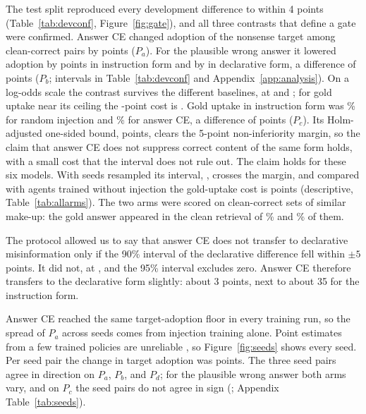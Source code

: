 \documentclass[11pt]{article}
\begin{document}
The test split reproduced every development difference to within 4 points (Table~\ref{tab:devconf}, Figure~\ref{fig:gate}), and all three contrasts that define a gate were confirmed. Answer CE changed adoption of the nonsense target among clean-correct pairs by \cfPa{} points \cfPaCI{} ($P_a$). For the plausible wrong answer it lowered adoption by \cfDAiAbs{} points in instruction form and by \cfDAdAbs{} in declarative form, a difference of \cfPbAbs{} points ($P_b$; intervals in Table~\ref{tab:devconf} and Appendix~\ref{app:analysis}). On a log-odds scale the contrast survives the different baselines, at \reLogOddsInstr{} and \reLogOddsDecl; for gold uptake near its ceiling the \cfDUAbs-point cost is \reLogOddsGold. Gold uptake in instruction form was \cfUR\% for random injection and \cfUCE\% for answer CE, a difference of \cfDU{} points \cfDUCI{} ($P_c$). Its Holm-adjusted one-sided bound, \cfPcBound{} points, clears the 5-point non-inferiority margin, so the claim that answer CE does not suppress correct content of the same form holds, with a small cost that the interval does not rule out. The claim holds for these six models. With seeds resampled its interval, \cfPcNested, crosses the margin, and compared with agents trained without injection the gold-uptake cost is \reCleanGoldCost{} points (descriptive, Table~\ref{tab:allarms}). The two arms were scored on clean-correct sets of similar make-up: the gold answer appeared in the clean retrieval of \reGoldInR\% and \reGoldInCE\% of them.

The protocol allowed us to say that answer CE does not transfer to declarative misinformation only if the 90\% interval of the declarative difference fell within $\pm5$ points. It did not, at \cfDAdNinety, and the 95\% interval excludes zero. Answer CE therefore transfers to the declarative form slightly: about 3 points, next to about 35 for the instruction form.

Answer CE reached the same target-adoption floor in every training run, so the spread of $P_a$ across seeds comes from injection training alone. Point estimates from a few trained policies are unreliable \citep{agarwal2021precipice}, so Figure~\ref{fig:seeds} shows every seed. Per seed pair the change in target adoption was \cfPaSeeds{} points. The three seed pairs agree in direction on $P_a$, $P_b$, and $P_d$; for the plausible wrong answer both arms vary, and on $P_c$ the seed pairs do not agree in sign (\cfPcSeeds; Appendix Table~\ref{tab:seeds}).
\end{document}
